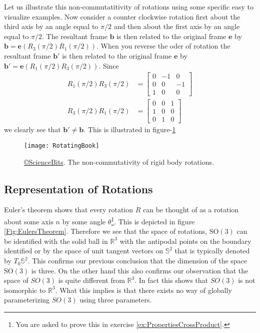 \documentclass[graybox,envcountchap,sectrefs]{svmonoMuga}
\begin{document}
Let us illustrate this non-commutatitivity of rotations using some specific easy to visualize  examples.
Now consider a counter clockwise rotation first about the third axis by an angle equal to $\pi/2$ and then about the first axis by an angle equal to $\pi/2$. The resultant frame 
$\mathbf{b}$ is then related to the original frame $\mathbf{e}$ by
$\mathbf{b}=\mathbf{e}(R_3(\pi/2)R_1(\pi/2))$. When you reverse the oder of rotation the resultant frame $\mathbf{b}'$ is then related to the original frame $\mathbf{e}$ by
$\mathbf{b}'=\mathbf{e}(R_1(\pi/2)R_3(\pi/2))$.
Since
\begin{align*}
R_1(\pi/2)R_3(\pi/2)&=\begin{bmatrix}0&-1&0\\0&0&-1\\1&0&0\end{bmatrix}\\
R_3(\pi/2)R_1(\pi/2)&=\begin{bmatrix}0&0&1\\1&0&0\\0&1&0\end{bmatrix}
\end{align*}
we clearly see that $\mathbf{b}'\neq\mathbf{b}$. This is illustrated in figure-\ref{Fig:RotatingBook}
\begin{figure}[ht]
\begin{center}
\texttt{[image: RotatingBook]} 
\renewcommand{\baselinestretch}{1}\selectfont
\caption{\href{http://www.sciencebits.com/vector_algebra}{\copyright ScienceBits}. The non-commutativity of rigid body rotations.}
\label{Fig:RotatingBook}
\renewcommand{\baselinestretch}{1.5}\selectfont
\end{center}
\end{figure}






\subsection{Representation of Rotations}
Euler's theorem shows that every rotation $R$ can be thought of as a rotation about some axis $n$ by some angle $\theta$\footnote{You are asked to prove this in exercise \ref{ex:PropertiesCrossProduct}.}. This is depicted in figure \ref{Fig:EulersTheorem}. Therefore we see that the space of rotations, $\mathrm{SO}(3)$ can be identified with the solid ball in $\mathbb{R}^3$ with the antipodal points on the boundary identified or by the space of unit tangent vectors on $\mathbb{S}^2$ that is typically denoted by $T_0\mathbb{S}^2$. This confirms our previous conclusion that the dimension of the space $\mathrm{SO}(3)$ is three. On the other hand this also confirms our observation that the space of $SO(3)$ is quite different from $\mathbb{R}^3$. In fact this shows that $SO(3)$ is not isomorphic to $\mathbb{R}^3$. What this implies is that there exists no way of globally parameterizing $SO(3)$ using three parameters.
\end{document}
